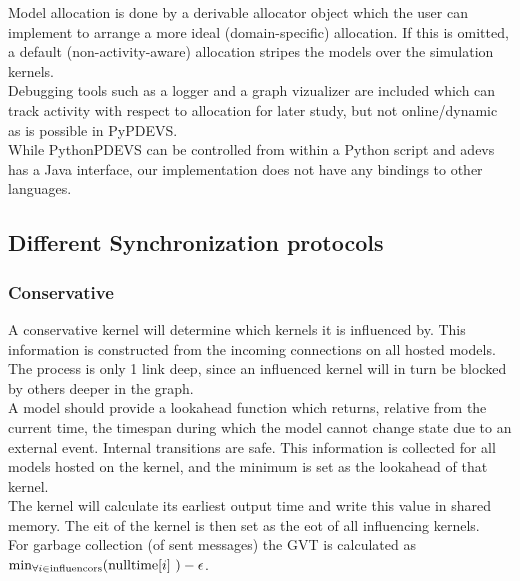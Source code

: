 Model allocation is done by a derivable allocator object which the user can implement to arrange a more ideal (domain-specific) allocation. If this is omitted, a default (non-activity-aware) allocation stripes the models over the simulation kernels.\\
Debugging tools such as a logger and a graph vizualizer are included which can track activity with respect to allocation for later study, but not online/dynamic as is possible in PyPDEVS.\\
While PythonPDEVS can be controlled from within a Python script and adevs has a Java interface, our implementation does not have any bindings to other languages.

\subsection{Different Synchronization protocols}
\subsubsection{Conservative}
A conservative kernel will determine which kernels it is influenced by. This information is constructed from the incoming connections on all hosted models. The process is only 1 link deep, since an influenced kernel will in turn be blocked by others deeper in the graph.\\
A model should provide a lookahead function which returns, relative from the current time, the timespan during which the model cannot change state due to an external event. Internal transitions are safe. This information is collected for all models hosted on the kernel, and the minimum is set as the lookahead of that kernel. \\
The kernel will calculate its earliest output time and write this value in shared memory. The eit of the kernel is then set as the eot of all influencing kernels. \\
For garbage collection (of sent messages) the GVT is calculated as $\min_{\forall i \in \textup{influencors}}( \textup{nulltime}[i]\ )  - \epsilon $. %

